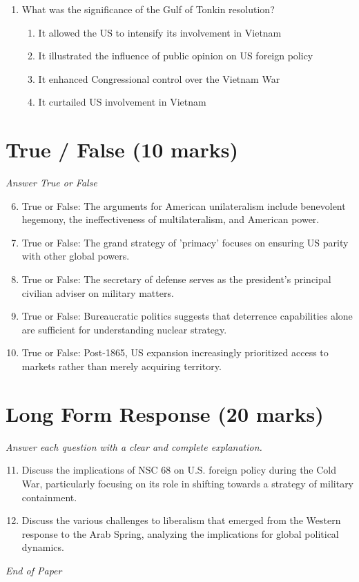 \documentclass[12pt]{article}
\begin{document}
\begin{enumerate}[label=\arabic*.]
\begin{enumerate}[label=(\alph*)]
    \item A new global economic framework
    \item A new era of globalization
\end{enumerate}
\item What was the significance of the Gulf of Tonkin resolution?
\begin{enumerate}[label=(\alph*)]
    \item It allowed the US to intensify its involvement in Vietnam
    \item It illustrated the influence of public opinion on US foreign policy
    \item It enhanced Congressional control over the Vietnam War
    \item It curtailed US involvement in Vietnam
\end{enumerate}
\end{enumerate}

\section*{True / False (10 marks)}
\textit{Answer True or False}
\begin{enumerate}[label=\arabic*.]
\setcounter{enumi}{5}
\item True or False: The arguments for American unilateralism include benevolent hegemony, the ineffectiveness of multilateralism, and American power.
\item True or False: The grand strategy of 'primacy' focuses on ensuring US parity with other global powers.
\item True or False: The secretary of defense serves as the president's principal civilian adviser on military matters.
\item True or False: Bureaucratic politics suggests that deterrence capabilities alone are sufficient for understanding nuclear strategy.
\item True or False: Post-1865, US expansion increasingly prioritized access to markets rather than merely acquiring territory.
\end{enumerate}

\section*{Long Form Response (20 marks)}
\textit{Answer each question with a clear and complete explanation.}
\begin{enumerate}[label=\arabic*.]
\setcounter{enumi}{10}
\item Discuss the implications of NSC 68 on U.S. foreign policy during the Cold War, particularly focusing on its role in shifting towards a strategy of military containment.
\item Discuss the various challenges to liberalism that emerged from the Western response to the Arab Spring, analyzing the implications for global political dynamics.
\end{enumerate}

\vfill
\noindent\textit{End of Paper}
\end{document}
